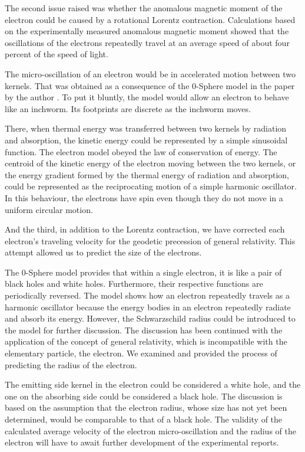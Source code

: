 \documentclass[%
 reprint,
 amsmath,amssymb,
 aps,
]{revtex4-1}
\numberwithin{equation}{section}%
\begin{document}
The second issue raised was whether the anomalous magnetic moment of the electron could be caused by a rotational Lorentz contraction. Calculations based on the experimentally measured anomalous magnetic moment showed that the oscillations of the electrons repeatedly travel at an average speed of about four percent of the speed of light.


The micro-oscillation of an electron would be in accelerated motion between two kernels. That was obtained as a consequence of the 0-Sphere model in the paper by the author \cite{Hanamura1}. To put it bluntly, the model would allow an electron to behave like an inchworm. Its footprints are discrete as the inchworm moves.

There, when thermal energy was transferred between two kernels by radiation and absorption, the kinetic energy could be represented by a simple sinusoidal function. The electron model obeyed the law of conservation of energy. The centroid of the kinetic energy of the electron moving between the two kernels, or the energy gradient formed by the thermal energy of radiation and absorption, could be represented as the reciprocating motion of a simple harmonic oscillator. In this behaviour, the electrons have spin even though they do not move in a uniform circular motion.


And the third, in addition to the Lorentz contraction, we have corrected each electron's traveling velocity for the geodetic precession of general relativity. This attempt allowed us to predict the size of the electrons.


The 0-Sphere model provides that within a single electron, it is like a pair of black holes and white holes. Furthermore, their respective functions are periodically reversed. The model shows how an electron repeatedly travels as a harmonic oscillator because the energy bodies in an electron repeatedly radiate and absorb its energy. However, the Schwarzschild radius could be introduced to the model for further discussion. The discussion has been continued with the application of the concept of general relativity, which is incompatible with the elementary particle, the electron. We examined and provided the process of predicting the radius of the electron.


The emitting side kernel in the electron could be considered a white hole, and the one on the absorbing side could be considered a black hole. The discussion is based on the assumption that the electron radius, whose size has not yet been determined, would be comparable to that of a black hole. The validity of the calculated  average velocity of the electron micro-oscillation and the radius of the electron will have to await further development of the experimental reports.
\end{document}
